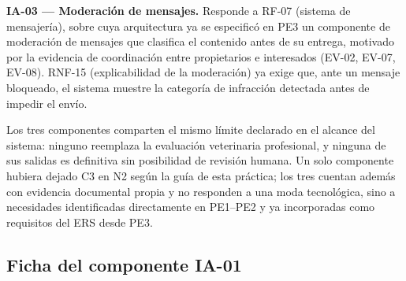 \documentclass[journal,onecolumn]{IEEEtran}
\begin{document}
\textbf{IA-03 --- Moderación de mensajes.} Responde a RF-07 (sistema de mensajería), sobre cuya
arquitectura ya se especificó en PE3 un componente de moderación de mensajes que clasifica el
contenido antes de su entrega, motivado por la evidencia de coordinación entre propietarios e
interesados (EV-02, EV-07, EV-08). RNF-15 (explicabilidad de la moderación) ya exige que, ante
un mensaje bloqueado, el sistema muestre la categoría de infracción detectada antes de impedir
el envío.

Los tres componentes comparten el mismo límite declarado en el alcance del sistema: ninguno
reemplaza la evaluación veterinaria profesional, y ninguna de sus salidas es definitiva sin
posibilidad de revisión humana. Un solo componente hubiera dejado C3 en N2 según la guía de
esta práctica; los tres cuentan además con evidencia documental propia y no responden a una
moda tecnológica, sino a necesidades identificadas directamente en PE1--PE2 y ya incorporadas
como requisitos del ERS desde PE3.

\subsection{Ficha del componente IA-01}
\end{document}
